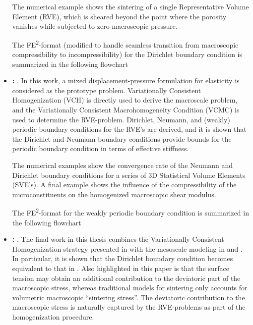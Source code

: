 \documentclass[MikaelDissertation.tex]{subfiles}
\begin{document}
\begin{itemize}
The numerical example shows the sintering of a single Representative Volume Element (RVE), which is sheared beyond the point where the porosity vanishes while subjected to zero macroscopic pressure.

The FE\textsuperscript{2}-format (modified to handle seamless transition from macroscopic compressibility to incompressibility) for the Dirichlet boundary condition is summarized in the following flowchart
\begin{center}
  
\end{center}


 \item \textbf{: }.
In this work, a mixed displacement-pressure formulation for elasticity is considered as the prototype problem.
Variationally Consistent Homogenization (VCH) is directly used to derive the macroscale problem, and the Variationally Consistent Macrohomogeneity Condition (VCMC) is used to determine the RVE-problem.
Dirichlet, Neumann, and (weakly) periodic boundary conditions for the RVE's are derived, and it is shown that the Dirichlet and Neumann boundary conditions provide bounds for the periodic boundary condition in terms of effective stiffness.

The numerical examples show the convergence rate of the Neumann and Dirichlet boundary conditions for a series of 3D Statistical Volume Elements (SVE's).
A final example shows the influence of the compressibility of the microconstituents on the homogenized macroscopic shear modulus.


The FE\textsuperscript{2}-format for the weakly periodic boundary condition is summarized in the following flowchart
\begin{center}
  
\end{center}


 \item \textbf{: }.
The final work in this thesis combines the Variationally Consistent Homogenization strategy presented in  with the mesoscale modeling in  and .
In particular, it is shown that the Dirichlet boundary condition becomes equivalent to that in .
Also highlighted in this paper is that the surface tension may obtain an additional contribution to the deviatoric part of the macroscopic stress, whereas traditional models for sintering only accounts for volumetric macroscopic ``sintering stress''.
The deviatoric contribution to the macroscopic stress is naturally captured by the RVE-problems as part of the homogenization procedure.


\end{itemize}
\end{document}
